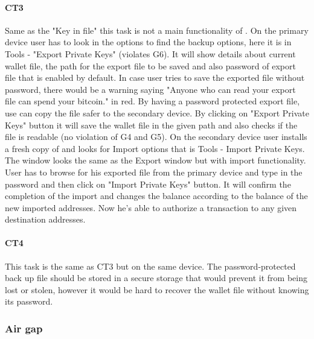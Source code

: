 \paragraph{CT3} Same as the "Key in file" this task is not a main functionality of \multibit. On the primary device user has to look in the options to find the backup options, here it is in Tools - "Export Private Keys" (violates G6). It will show details about current wallet file, the path for the export file to be saved and also password of export file that is enabled by default. In case user tries to save the exported file without password, there would be a warning saying "Anyone who can read your export file can spend your bitcoin." in red. By having a password protected export file, use can copy the file safer to the secondary device. By clicking on "Export Private Keys" button it will save the wallet file in the given path and also checks if the file is readable (no violation of G4 and G5). On the secondary device user installs a fresh copy of \multibit and looks for Import options that is Tools - Import Private Keys. The window looks the same as the Export window but with import functionality. User has to browse for his exported file from the primary device and type in the password and then click on "Import Private Keys" button. It will confirm the completion of the import and changes the balance according to the balance of the new imported addresses. Now he's able to authorize a transaction to any given destination addresses.


\paragraph{CT4} This task is the same as CT3 but on the same device. The password-protected back up file should be stored in a secure storage that would prevent it from being lost or stolen, however it would be hard to recover the wallet file without knowing its password. 



\subsubsection{Air gap}
\label{sec:air gap}


